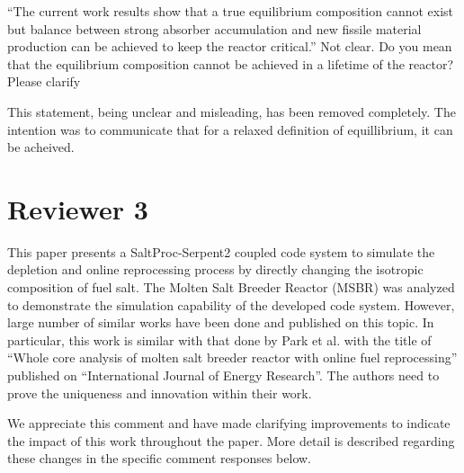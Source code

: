 \documentclass[answers,11pt]{exam}
\begin{document}
\begin{questions}



        \question ``The current work results show that a true equilibrium 
        composition cannot exist but balance between strong absorber 
        accumulation and new fissile material production can be achieved to 
        keep the reactor critical.'' Not clear. Do you mean that the equilibrium 
        composition cannot be achieved in a lifetime of the reactor? Please 
        clarify
        \begin{solution}
                This statement, being unclear and misleading, has been removed 
                completely. The intention was to communicate that for a relaxed 
                definition of equillibrium, it can be acheived.
        \end{solution}




        \section*{Reviewer 3}

        \question This paper presents a SaltProc-Serpent2 coupled code system
        to simulate the depletion and online reprocessing process by directly
        changing the isotropic composition of fuel salt. The Molten Salt
        Breeder Reactor (MSBR) was analyzed to demonstrate the simulation
        capability of the developed code system. However, large number of
        similar works have been done and published on this topic. In
        particular, this work is similar with that done by Park et al. with the
        title of ``Whole core analysis of molten salt breeder reactor with
        online fuel reprocessing'' published on ``International Journal of Energy
        Research''. The authors need to prove the uniqueness and innovation
        within their work.
        \begin{solution}
                We appreciate this comment and have made clarifying 
                improvements to indicate the impact of this work throughout the 
                paper. More detail is described regarding these changes in the 
                specific comment responses below.
        \end{solution}



\end{questions}
\end{document}
